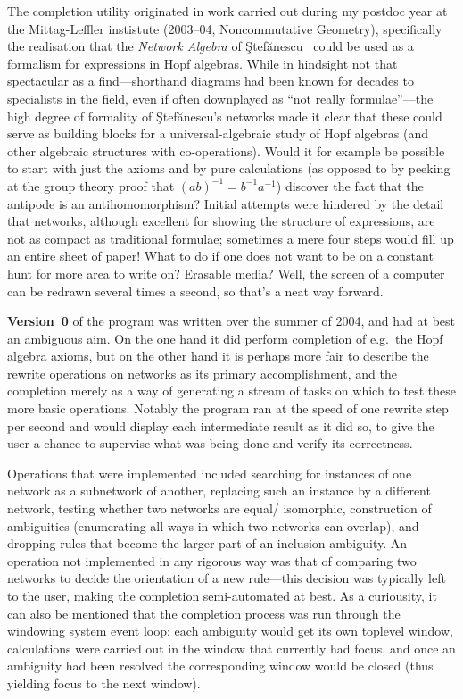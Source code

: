\documentclass{article}
\theoremstyle{definition}
\begin{document}
The completion utility originated in work carried out during my 
postdoc year at the Mittag-Leffler instistute (2003--04, 
Noncommutative Geometry), specifically the realisation that the 
\emph{Network Algebra} of \c{S}tef\u{a}nescu~\cite{Stefanescu} could 
be used as a formalism for expressions in Hopf algebras. While in 
hindsight not that spectacular as a find---shorthand diagrams had 
been known for decades to specialists in the field, even if often 
downplayed as ``not really formulae''---the high degree of formality 
of \c{S}tef\u{a}nescu's networks made it clear that these could serve 
as building blocks for a universal-algebraic study of Hopf algebras 
(and other algebraic structures with co-operations). Would it for 
example be possible to start with just the axioms and by pure 
calculations (as opposed to by peeking at the group theory proof that 
\((ab)^{-1} = b^{-1} a^{-1}\)) discover the fact that the antipode is 
an antihomomorphism? Initial attempts were hindered by the detail 
that networks, although excellent for showing the structure of 
expressions, are not as compact as traditional formulae; sometimes a 
mere four steps would fill up an entire sheet of paper! What to do if 
one does not want to be on a constant hunt for more area to write on? 
Erasable media? Well, the screen of a computer can be redrawn several 
times a second, so that's a neat way forward.


\textbf{Version~0} of the program was written over the summer of 
2004, and had at best an ambiguous aim. On the one hand it did perform 
completion of e.g.~the Hopf algebra axioms, but on the other hand it 
is perhaps more fair to describe the rewrite operations on networks 
as its primary accomplishment, and the completion merely as a way of 
generating a stream of tasks on which to test these more basic 
operations. Notably the program ran at the speed of one rewrite step 
per second and would display each intermediate result as it did so, 
to give the user a chance to supervise what was being done and verify 
its correctness.

Operations that were implemented included searching for instances of 
one network as a subnetwork of another, replacing such an instance by 
a different network, testing whether two networks are equal\slash 
isomorphic, construction of ambiguities (enumerating all ways in 
which two networks can overlap), and dropping rules that become the 
larger part of an inclusion ambiguity. An operation not implemented 
in any rigorous way was that of comparing two networks to decide the 
orientation of a new rule---this decision was typically left to the 
user, making the completion semi-automated at best. As a curiousity, 
it can also be mentioned that the completion process was run through 
the windowing system event loop: each ambiguity would get its own 
toplevel window, calculations were carried out in the window that 
currently had focus, and once an ambiguity had been resolved the 
corresponding window would be closed (thus yielding focus to the next 
window).
\end{document}
